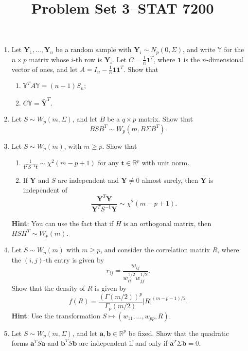 \documentclass[12pt]{paper}
\title{	
Problem Set 3--STAT 7200
}
\author{} %
\date{} %
\numberwithin{equation}{section} %
\numberwithin{figure}{section} %
\numberwithin{table}{section} %
\begin{document}
\maketitle %


\begin{enumerate}
	\item Let $\mathbf{Y}_1, \ldots, \mathbf{Y}_n$ be a random sample with $\mathbf{Y}_i \sim N_p(0, \Sigma)$, and write $\mathbb{Y}$ for the $n\times p$ matrix whose $i$-th row is $\mathbf{Y}_i$. Let $C = \frac{1}{n}\mathbf{1}^T$, where $\mathbf{1}$ is the $n$-dimensional vector of ones, and let $A = I_n - \frac{1}{n}\mathbf{1}\mathbf{1}^T$. Show that
	\begin{enumerate}
		\item $\mathbb{Y}^T A \mathbb{Y} = (n-1)S_n$;
		\item $C \mathbb{Y} = \bar{\mathbf{Y}}^T$.
	\end{enumerate}
	
	\vspace{1.5cm}\item Let $S\sim W_p(m, \Sigma)$, and let $B$ be a $q\times p$ matrix. Show that
	$$ BSB^T \sim W_p(m, B\Sigma B^T).$$
	
	\vspace{1.5cm}\item Let $S\sim W_p(m)$, with $m\geq p$. Show that
	\begin{enumerate}
		\item $\frac{1}{\mathbf{t}^TS^{-1}\mathbf{t}}\sim \chi^2(m - p + 1)$ for any $\mathbf{t}\in\mathbb{R}^p$ with unit norm.
		\item If $\mathbf{Y}$ and $S$ are independent and $\mathbf{Y} \neq 0$ almost surely, then $\mathbf{Y}$ is independent of
		$$\frac{\mathbf{Y}^T\mathbf{Y}}{\mathbf{Y}^TS^{-1}\mathbf{Y}}\sim \chi^2(m - p + 1).$$
	\end{enumerate}
	\textbf{Hint}: You can use the fact that if $H$ is an orthogonal matrix, then $HSH^T\sim W_p(m)$.
	
	\vspace{1.5cm}\item Let $S\sim W_p(m)$ with $m \geq p$, and consider the correlation matrix $R$, where the $(i,j)$-th entry is given by
	$$r_{ij} = \frac{w_{ij}}{w_{ii}^{1/2}w_{jj}^{1/2}}.$$
	Show that the density of $R$ is given by
	$$ f(R) = \frac{(\Gamma(m/2))^p}{\Gamma_p(m/2)}\lvert R \rvert^{(m-p-1)/2}.$$
	\textbf{Hint}: Use the transformation $S \mapsto  \left(w_{11} ,\ldots, w_{pp} , R\right)$.
	
	\vspace{1.5cm}\item Let $S\sim W_p(m, \Sigma)$, and let $\mathbf{a},\mathbf{b}\in\mathbb{R}^p$ be fixed. Show that the quadratic forms $\mathbf{a}^T S \mathbf{a}$ and $\mathbf{b}^T S \mathbf{b}$ are independent if and only if $\mathbf{a}^T \Sigma \mathbf{b} = 0$.
	
\end{enumerate}
\end{document}
